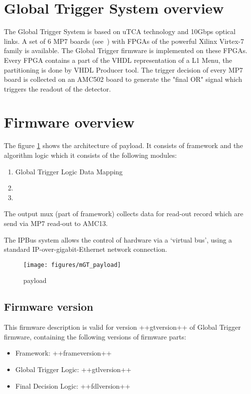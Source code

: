 \section{Global Trigger System overview}\label{sec:gt_system}

The Global Trigger System is based on uTCA technology and 10Gbps optical links. A set of 6 MP7 boards (see~\cite{MP7}) with FPGAs of the powerful Xilinx Virtex-7 family is available. The Global Trigger firmware is implemented on these FPGAs. Every FPGA contains a part of the VHDL representation of a L1 Menu, the partitioning is done by VHDL Producer tool. The trigger decision of every MP7 board is collected on an AMC502 board to generate the "final OR" signal which triggers the readout of the detector.

\section{Firmware overview}\label{sec:fw}
The figure \ref{fig:mgt} shows the architecture of \ugt payload. It consists of framework and the algorithm logic which it consists of the following modules:
\begin{enumerate}
\item Global Trigger Logic Data Mapping
\item \ugtl
\item \ufdl
\end{enumerate}

The output mux (part of framework) collects data for read-out record which are send via MP7 read-out to AMC13.

The IPBus system allows the control of hardware via a ‘virtual bus’, using a standard IP-over-gigabit-Ethernet network connection.
\begin{figure}[h!]
   \centering
    \texttt{[image: figures/mGT\_payload]}
    \caption{\ugt payload}\label{fig:mgt}
 \end{figure}

\subsection{Firmware version}\label{sec:fw_version}

This firmware description is valid for version ++gtversion++ of Global Trigger firmware, containing the following versions of firmware parts:
\begin{itemize}
\item Framework: ++frameversion++
\item Global Trigger Logic: ++gtlversion++
\item Final Decision Logic: ++fdlversion++
\end{itemize}

